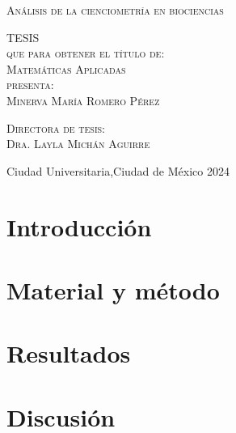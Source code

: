 \documentclass[letterpaper,12pt]{book}
\begin{document}
\begin{titlepage}
\begin{minipage}[c][0.81\textheight][t]{0.75\textwidth}
\begin{center}
                {\large\scshape Análisis de la cienciometría en biociencias}\\[.2in]

                \vspace{2cm}            

                \textsc{\LARGE T\hspace{.8cm}E\hspace{.8cm}S\hspace{.8cm}I\hspace{.8cm}S\hspace{.8cm}}\\[0.5cm]
                \textsc{\large que para obtener el t\'itulo de:}\\[0.5cm]
                \textsc{\large Matemáticas Aplicadas}\\[0.5cm]
                \textsc{\large presenta:}\\[0.5cm]
                \textsc{\large {Minerva María Romero Pérez}}\\[2cm]          

                \vspace{0.5cm}

                {\large\scshape Directora de tesis:\\[0.3cm] {Dra. Layla Michán Aguirre }}\\[.2in]

                \vspace{0.5cm}

                \large{Ciudad Universitaria,Ciudad de México}{ }{2024}
            \end{center}
        \end{minipage}
    \end{titlepage}
\frontmatter
\tableofcontents
\mainmatter %

\chapter{Introducción}


\chapter{Material y método}


\chapter{Resultados}


\chapter{Discusión}




\printbibliography
\backmatter
\end{document}
